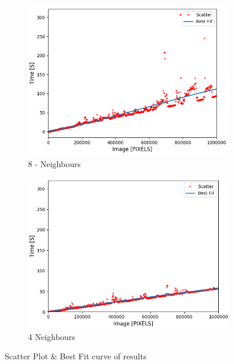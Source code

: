 \documentclass{article}
\begin{document}
\begin{figure}[H]
\centering
\begin{subfigure}{.5\textwidth}
  \centering
  \includegraphics[width=\linewidth]{tests/performane_8.png}
  \caption{8 - Neighbours}
  \label{fig:sub1}
\end{subfigure}%
\begin{subfigure}{.5\textwidth}
  \centering
  \includegraphics[width=\linewidth]{tests/performance_4.png}
  \caption{4 Neighbours}
  \label{fig:sub2}
\end{subfigure}
\caption{Scatter Plot  \& Best Fit curve of results}
\label{fig:general_test}
\end{figure}
\end{document}
